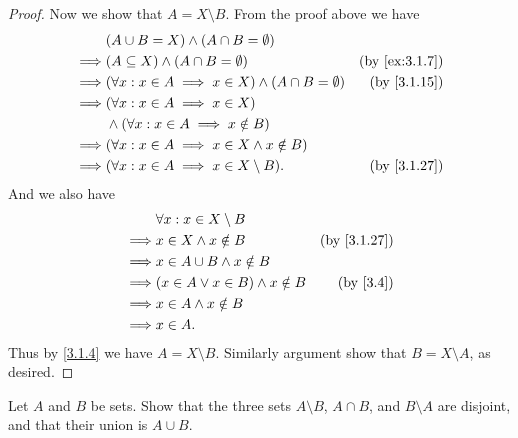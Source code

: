 \begin{proof}
  Now we show that \(A = X \setminus B\).
  From the proof above we have
  \begin{align*}
             & (A \cup B = X) \land (A \cap B = \emptyset)                                                       \\
    \implies & (A \subseteq X) \land (A \cap B = \emptyset)                        & \text{(by \cref{ex:3.1.7})} \\
    \implies & (\forall x : x \in A \implies x \in X) \land (A \cap B = \emptyset) & \text{(by \cref{3.1.15})}   \\
    \implies & (\forall x : x \in A \implies x \in X)                                                            \\
             & \land (\forall x : x \in A \implies x \notin B)                                                   \\
    \implies & (\forall x : x \in A \implies x \in X \land x \notin B)                                           \\
    \implies & (\forall x : x \in A \implies x \in X \setminus B).                 & \text{(by \cref{3.1.27})}
  \end{align*}
  And we also have
  \begin{align*}
             & \forall x : x \in X \setminus B                                     \\
    \implies & x \in X \land x \notin B                & \text{(by \cref{3.1.27})} \\
    \implies & x \in A \cup B \land x \notin B                                     \\
    \implies & (x \in A \lor x \in B) \land x \notin B & \text{(by \cref{3.4})}    \\
    \implies & x \in A \land x \notin B                                            \\
    \implies & x \in A.
  \end{align*}
  Thus by \cref{3.1.4} we have \(A = X \setminus B\).
  Similarly argument show that \(B = X \setminus A\), as desired.
\end{proof}

\begin{ex}\label{ex:3.1.10}
  Let \(A\) and \(B\) be sets.
  Show that the three sets \(A \setminus B\), \(A \cap B\), and \(B \setminus A\) are disjoint, and that their union is \(A \cup B\).
\end{ex}

